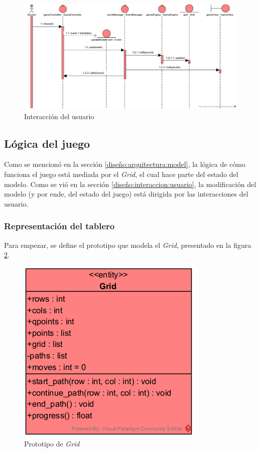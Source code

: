 \documentclass[letter,12pt]{article}
\begin{document}
\begin{figure}[ht!]
	\centering
	\includegraphics[scale=0.6]{img/sd_user_interaction.png}
	\caption{Interacción del usuario}
	\label{fig:interaccion_usuario}
\end{figure}

\subsection{Lógica del juego} \label{diseño:logica}

Como se mencionó en la sección \ref{diseño:arquitectura:model}, la lógica de cómo funciona el juego está mediada por el \textit{Grid}, el cual hace parte del estado del modelo. Como se vió en la sección \ref{diseño:interaccion:usuario}, la modificación del modelo (y por ende, del estado del juego) está dirigida por las interacciones del usuario. \par

\subsubsection{Representación del tablero} \label{diseño:logica:tablero}

Para empezar, se define el prototipo que modela el \textit{Grid}, presentado en la figura \ref{fig:prototipo_grid}. \par

\begin{figure}[ht!]
	\centering
	\includegraphics[scale=1]{img/cd_grid.png}
	\caption{Prototipo de \textit{Grid}}
	\label{fig:prototipo_grid}
\end{figure}
\end{document}
